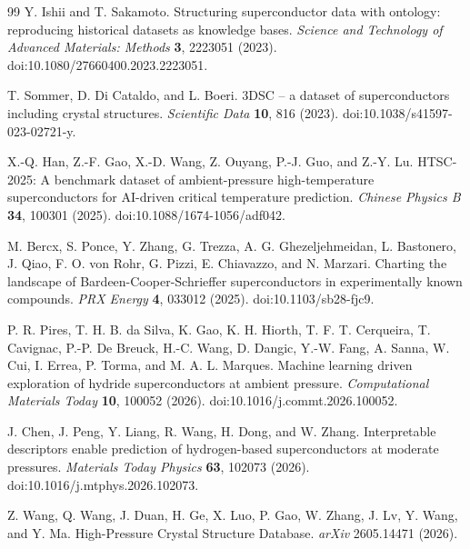 \documentclass[11pt,a4paper]{article}
\begin{document}
\begin{thebibliography}{99}
Y. Ishii and T. Sakamoto.
Structuring superconductor data with ontology: reproducing historical datasets as knowledge bases.
\textit{Science and Technology of Advanced Materials: Methods} \textbf{3}, 2223051 (2023).
doi:10.1080/27660400.2023.2223051.

T. Sommer, D. Di Cataldo, and L. Boeri.
3DSC -- a dataset of superconductors including crystal structures.
\textit{Scientific Data} \textbf{10}, 816 (2023).
doi:10.1038/s41597-023-02721-y.

X.-Q. Han, Z.-F. Gao, X.-D. Wang, Z. Ouyang, P.-J. Guo, and Z.-Y. Lu.
HTSC-2025: A benchmark dataset of ambient-pressure high-temperature superconductors for AI-driven critical temperature prediction.
\textit{Chinese Physics B} \textbf{34}, 100301 (2025).
doi:10.1088/1674-1056/adf042.

M. Bercx, S. Ponce, Y. Zhang, G. Trezza, A. G. Ghezeljehmeidan, L. Bastonero, J. Qiao, F. O. von Rohr, G. Pizzi, E. Chiavazzo, and N. Marzari.
Charting the landscape of Bardeen-Cooper-Schrieffer superconductors in experimentally known compounds.
\textit{PRX Energy} \textbf{4}, 033012 (2025).
doi:10.1103/sb28-fjc9.

P. R. Pires, T. H. B. da Silva, K. Gao, K. H. Hiorth, T. F. T. Cerqueira, T. Cavignac, P.-P. De Breuck, H.-C. Wang, D. Dangic, Y.-W. Fang, A. Sanna, W. Cui, I. Errea, P. Torma, and M. A. L. Marques.
Machine learning driven exploration of hydride superconductors at ambient pressure.
\textit{Computational Materials Today} \textbf{10}, 100052 (2026).
doi:10.1016/j.commt.2026.100052.

J. Chen, J. Peng, Y. Liang, R. Wang, H. Dong, and W. Zhang.
Interpretable descriptors enable prediction of hydrogen-based superconductors at moderate pressures.
\textit{Materials Today Physics} \textbf{63}, 102073 (2026).
doi:10.1016/j.mtphys.2026.102073.

Z. Wang, Q. Wang, J. Duan, H. Ge, X. Luo, P. Gao, W. Zhang, J. Lv, Y. Wang, and Y. Ma.
High-Pressure Crystal Structure Database.
\textit{arXiv} 2605.14471 (2026).

\end{thebibliography}
\end{document}
